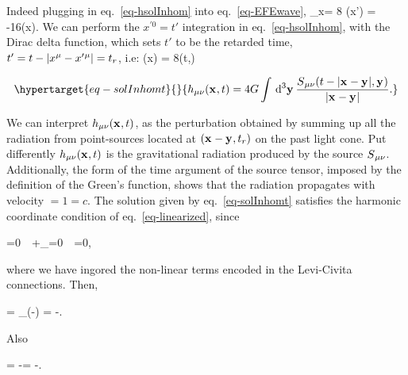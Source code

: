 \documentclass[
  10pt,
  a4paper,
  DIV=11,
  numbers=noendperiod,
  twoside]{scrreprt}
\let\[\relax \let\]\relax %
\DeclareRobustCommand{\[}{\begin{equation}}
\DeclareRobustCommand{\]}{\end{equation}}
\begin{document}

Indeed plugging in eq.~\ref{eq-hsolInhom} into eq.~\ref{eq-EFEwave}, \[
    \Box_x\weakmet = 8\grav\int{} \srcco(x') = -16\pi \grav\srcco(x).
\] We can perform the \(x^{\prime0}=t'\) integration in
eq.~\ref{eq-hsolInhom}, with the Dirac delta function, which sets \(t'\)
to be the retarded time, \(t'=t-\vert x{}^{\mu}-x'{}^{\mu} \vert= t_r\), i.e: \[
\weakmet(x) = 8\grav\int{}\srcco(t,) 
\]

\begin{equation}\protect\hypertarget{eq-solInhomt}{}{
\weakmet(\tv{x},t) = 4\grav\int\dd[3]{\tv{y}}\frac{\srcco(t-\abs{\tv{x}-\tv{y}},\tv{y})}{\abs{\tv{x}-\tv{y}}}.
}\label{eq-solInhomt}\end{equation}

We can interpret \(h{}_{\mu\nu}(\mathbf{{x}}_{},t)\), as the perturbation obtained by
summing up all the radiation from point-sources located at
\((\mathbf{{x}}_{}-\mathbf{{y}}_{},t_r)\) on the past light cone. Put differently
\(h{}_{\mu\nu}(\mathbf{{x}}_{},t)\) is the gravitational radiation produced by the
source \(S{}_{\mu\nu}\). Additionally, the form of the time argument of the
source tensor, imposed by the definition of the Green's function, shows
that the radiation propagates with velocity \(=1=c\). The solution given
by eq.~\ref{eq-solInhomt} satisfies the harmonic coordinate condition of
eq.~\ref{eq-linearized}, since

\[
    \covd{\SEco}{\mu}=0\ \Rightarrow\ \ipdv{\SEco}{\mu}+\underbracket{\Gamma\,\Gamma\,}_{}=0\ \Rightarrow\ \ipdv{\SEco}{\mu}=0,
\]

where we have ingored the non-linear terms encoded in the Levi-Civita
connections. Then,

\[
    \ipdv{\srcct}{\mu} = \partial_\mu\left(\SEco-\trSE\right) = -\ipdv{\trSE}{\mu}.
\]

Also

\[
    \trsrc[\mu] = \trSE[\mu] -\trSE = -\trSE.
\]
\end{document}
